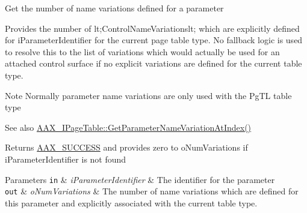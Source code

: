 Get the number of name variations defined for a parameter

Provides the number of {\ttfamily lt;Control\+Name\+Variationslt;} which are explicitly defined for {\ttfamily i\+Parameter\+Identifier} for the current page table type. No fallback logic is used to resolve this to the list of variations which would actually be used for an attached control surface if no explicit variations are defined for the current table type.

\begin{DoxyNote}{Note}
Normally parameter name variations are only used with the {\ttfamily \textquotesingle{}Pg\+T\+L\textquotesingle{}} table type
\end{DoxyNote}

\begin{DoxyItemize}
\item \begin{DoxySeeAlso}{See also}
\hyperlink{a00107_adffe5a5f2ad548bd4c704508d816d568}{A\+A\+X\+\_\+\+I\+Page\+Table\+::\+Get\+Parameter\+Name\+Variation\+At\+Index()}
\end{DoxySeeAlso}
\begin{DoxyReturn}{Returns}
\hyperlink{a00207_a5f8c7439f3a706c4f8315a9609811937aeddbd1bb67e3a66e6af54a4b4a7a57b3}{A\+A\+X\+\_\+\+S\+U\+C\+C\+E\+S\+S} and provides zero to {\ttfamily o\+Num\+Variations} if {\ttfamily i\+Parameter\+Identifier} is not found
\end{DoxyReturn}

\begin{DoxyParams}[1]{Parameters}
\mbox{\tt in}  & {\em i\+Parameter\+Identifier} & The identifier for the parameter \\
\hline
\mbox{\tt out}  & {\em o\+Num\+Variations} & The number of name variations which are defined for this parameter and explicitly associated with the current table type. \\
\hline
\end{DoxyParams}

\end{DoxyItemize}\hypertarget{a00075_ab866525f8d8902ed8782dc01087d71ce}{}
